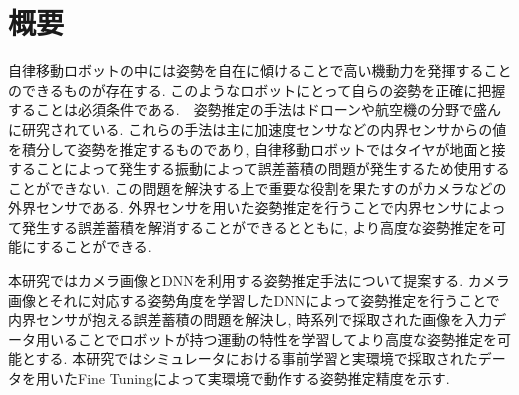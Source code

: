 \chapter*{概要}
自律移動ロボットの中には姿勢を自在に傾けることで高い機動力を発揮することのできるものが存在する. このようなロボットにとって自らの姿勢を正確に把握することは必須条件である.　姿勢推定の手法はドローンや航空機の分野で盛んに研究されている. これらの手法は主に加速度センサなどの内界センサからの値を積分して姿勢を推定するものであり, 自律移動ロボットではタイヤが地面と接することによって発生する振動によって誤差蓄積の問題が発生するため使用することができない. この問題を解決する上で重要な役割を果たすのがカメラなどの外界センサである. 外界センサを用いた姿勢推定を行うことで内界センサによって発生する誤差蓄積を解消することができるとともに, より高度な姿勢推定を可能にすることができる. \par
本研究ではカメラ画像とDNNを利用する姿勢推定手法について提案する. カメラ画像とそれに対応する姿勢角度を学習したDNNによって姿勢推定を行うことで内界センサが抱える誤差蓄積の問題を解決し, 時系列で採取された画像を入力データ用いることでロボットが持つ運動の特性を学習してより高度な姿勢推定を可能とする. 本研究ではシミュレータにおける事前学習と実環境で採取されたデータを用いたFine Tuningによって実環境で動作する姿勢推定精度を示す.
